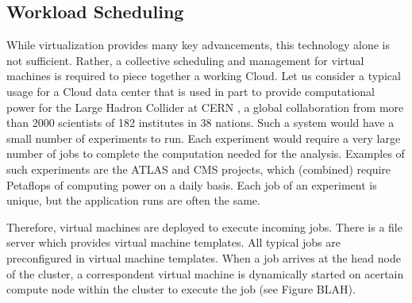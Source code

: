 






\subsection{Workload Scheduling}

While virtualization provides many key advancements, this technology alone is not sufficient.  Rather, a collective scheduling and management for virtual machines is required to piece together a working Cloud.  Let us consider a typical usage for a Cloud data center that is used in part to provide computational power for the Large Hadron Collider at CERN \cite{CERN2003}, a global collaboration from more than 2000 scientists of 182 institutes in 38 nations.  Such a system would have a small number of experiments to run. Each experiment would require a very large number of jobs to complete the computation needed for the analysis.  Examples of such experiments are the ATLAS \cite{luo2005gsp} and CMS \cite{cms} projects, which (combined) require Petaflops of computing power on a daily basis.  Each job of an experiment is unique, but the application runs are often the same.  

Therefore, virtual machines are deployed to execute incoming jobs. There is a file server which provides virtual machine templates. All typical jobs are preconfigured in virtual machine templates. When a job arrives at the head node of the  cluster, a correspondent virtual machine is dynamically started on acertain compute node within the cluster to execute the job (see Figure BLAH).

